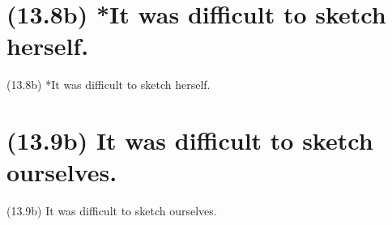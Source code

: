 \documentclass{article}
\begin{document}
\clearpage

%
%

\section*{(13.8b) *It was difficult to sketch herself.}

\bigbreak
\begin{enumerate*}
\item[(13.8b)] *It was difficult to sketch herself.
\end{enumerate*}
\bigbreak

\bigbreak
\begin{minipage}{\textwidth}
\end{minipage}
\bigbreak

\clearpage

%
%

\section*{(13.9b) It was difficult to sketch ourselves.}

\bigbreak
\begin{enumerate*}
\item[(13.9b)] It was difficult to sketch ourselves.
\end{enumerate*}
\bigbreak
\end{document}
